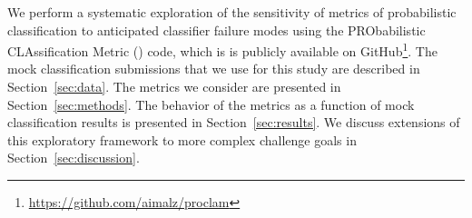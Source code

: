 We perform a systematic exploration of the sensitivity of metrics of probabilistic classification to anticipated classifier failure modes using the PRObabilistic CLAssification Metric (\proclam) code, which is is publicly available on GitHub\footnote{\url{https://github.com/aimalz/proclam}}.
The mock classification submissions that we use for this study are described in Section~\ref{sec:data}.
The metrics we consider are presented in Section~\ref{sec:methods}.
The behavior of the metrics as a function of mock classification results is presented in Section~\ref{sec:results}.
We discuss extensions of this exploratory framework to more complex challenge goals in Section~\ref{sec:discussion}.
